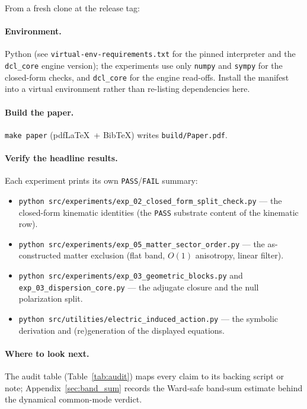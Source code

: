 \label{sec:reproducibility}

From a fresh clone at the release tag:

\paragraph{Environment.} Python (see \texttt{virtual-env-requirements.txt} for the
pinned interpreter and the \texttt{dcl\_core} engine version); the experiments use
only \texttt{numpy} and \texttt{sympy} for the closed-form checks, and
\texttt{dcl\_core} for the engine read-offs. Install the manifest into a virtual
environment rather than re-listing dependencies here.

\paragraph{Build the paper.} \texttt{make paper} (pdf\LaTeX\ + Bib\TeX) writes
\texttt{build/Paper.pdf}.

\paragraph{Verify the headline results.} Each experiment prints its own
\texttt{PASS}/\texttt{FAIL} summary:
\begin{itemize}
  \item \texttt{python src/experiments/exp\_02\_closed\_form\_split\_check.py} ---
    the closed-form kinematic identities (the \texttt{PASS} substrate content of the
    kinematic row).
  \item \texttt{python src/experiments/exp\_05\_matter\_sector\_order.py} --- the
    as-constructed matter exclusion (flat band, $O(1)$ anisotropy, linear filter).
  \item \texttt{python src/experiments/exp\_03\_geometric\_blocks.py} and
    \texttt{exp\_03\_dispersion\_core.py} --- the adjugate closure and the null
    polarization split.
  \item \texttt{python src/utilities/electric\_induced\_action.py} --- the symbolic
    derivation and (re)generation of the displayed equations.
\end{itemize}

\paragraph{Where to look next.} The audit table (Table~\ref{tab:audit}) maps every
claim to its backing script or note; Appendix~\ref{sec:band_sum} records the
Ward-safe band-sum estimate behind the dynamical common-mode verdict.
